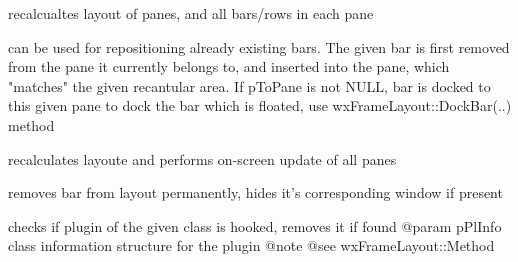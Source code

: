\label{wxframelayoutrecalclayout}


recalcualtes layout of panes, and all bars/rows in each pane


\label{wxframelayoutredockbar}


can be used for repositioning already existing bars. The given bar is first removed
from the pane it currently belongs to, and inserted into the pane, which "matches"
the given recantular area. If pToPane is not NULL, bar is docked to this given pane
to dock the bar which is floated, use wxFrameLayout::DockBar(..) method


\label{wxframelayoutrefreshnow}


recalculates layoute and performs on-screen update of all panes


\label{wxframelayoutreleaseeventsfrompane}



\label{wxframelayoutreleaseeventsfromplugin}



\label{wxframelayoutremovebar}


removes bar from layout permanently, hides it's corresponding window if present


\label{wxframelayoutremoveplugin}


checks if plugin of the given class is hooked, removes
it if found
@param pPlInfo class information structure for the plugin
@note
@see wxFrameLayout::Method


\label{wxframelayoutreparentwindow}

